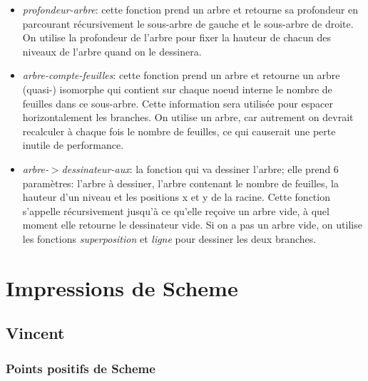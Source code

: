 \documentclass[10pt]{report}
\begin{document}
\begin{itemize}
\item \emph{profondeur-arbre}: cette fonction prend un arbre et
  retourne sa profondeur en parcourant récursivement le sous-arbre de
  gauche et le sous-arbre de droite.  On utilise la profondeur de
  l'arbre pour fixer la hauteur de chacun des niveaux de l'arbre quand
  on le dessinera.
\item \emph{arbre-compte-feuilles}: cette fonction prend un arbre et
  retourne un arbre (quasi-) isomorphe qui contient sur chaque noeud
  interne le nombre de feuilles dans ce sous-arbre.  Cette information
  sera utilisée pour espacer horizontalement les branches.  On utilise
  un arbre, car autrement on devrait recalculer à chaque fois le
  nombre de feuilles, ce qui causerait une perte inutile de
  performance.
\item \emph{arbre-$>$dessinateur-aux}: la fonction qui va dessiner
  l'arbre; elle prend 6 paramètres: l'arbre à dessiner, l'arbre
  contenant le nombre de feuilles, la hauteur d'un niveau et les
  positions x et y de la racine.  Cette fonction s'appelle
  récursivement jusqu'à ce qu'elle reçoive un arbre vide, à quel
  moment elle retourne le dessinateur vide.  Si on a pas un arbre
  vide, on utilise les fonctions \emph{superposition} et \emph{ligne}
  pour dessiner les deux branches.
\end{itemize}




\section{Impressions de Scheme}

\subsection{Vincent}

\subsubsection{Points positifs de Scheme}
\end{document}
